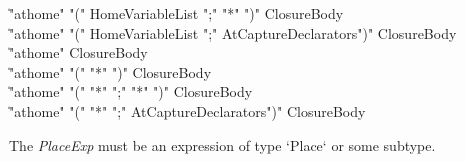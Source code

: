 \begin{bbgrammar}
                    \| \xcd"athome" \xcd"(" HomeVariableList \xcd";" \xcd"*" \xcd")" ClosureBody \\
                    \| \xcd"athome" \xcd"(" HomeVariableList \xcd";" AtCaptureDeclarators\opt \xcd")" ClosureBody \\
                    \| \xcd"athome" ClosureBody \\
                    \| \xcd"athome" \xcd"(" \xcd"*" \xcd")" ClosureBody \\
                    \| \xcd"athome" \xcd"(" \xcd"*" \xcd";" \xcd"*" \xcd")" ClosureBody \\
                    \| \xcd"athome" \xcd"(" \xcd"*" \xcd";" AtCaptureDeclarators\opt \xcd")" ClosureBody \\
\end{bbgrammar}

The {\it PlaceExp} must be an expression of type \xcd`Place` or some subtype.



